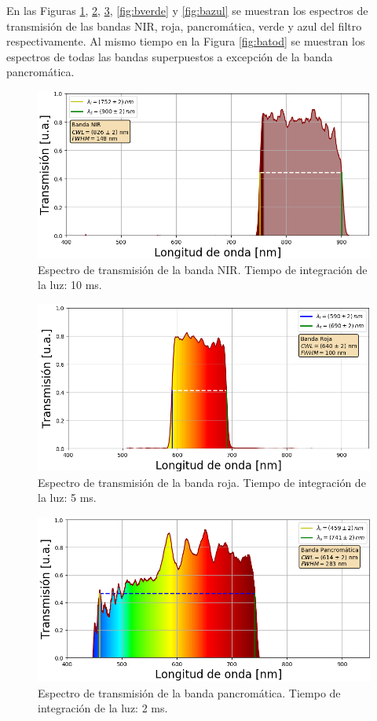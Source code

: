 En las Figuras \ref{fig:bnir}, \ref{fig:broja}, \ref{fig:bpanc}, \ref{fig:bverde} y \ref{fig:bazul} se muestran los espectros de transmisión de las bandas NIR, roja, pancromática, verde y azul del filtro respectivamente. Al mismo tiempo en la Figura \ref{fig:batod} se muestran los espectros de todas las bandas superpuestos a excepción de la banda pancromática.
\begin{figure}[H]
	\centering
	\includegraphics[scale=0.8]{Figs/microespectrometro/espectro_nirt.png}
	\caption{Espectro de transmisión de la banda NIR. Tiempo de integración de la luz: 10 ms.}
	\label{fig:bnir}
\end{figure}
\begin{figure}[H]
	\centering
	\includegraphics[scale=0.8]{Figs/microespectrometro/espectro_rojat.png}
	\caption{Espectro de transmisión de la banda roja. Tiempo de integración de la luz: 5 ms.}
	\label{fig:broja}
\end{figure}
\begin{figure}[H]
	\centering
	\includegraphics[scale=0.8]{Figs/microespectrometro/espectro_pancromaticat.png}
	\caption{Espectro de transmisión de la banda pancromática. Tiempo de integración de la luz: 2 ms.}
	\label{fig:bpanc}
\end{figure}
